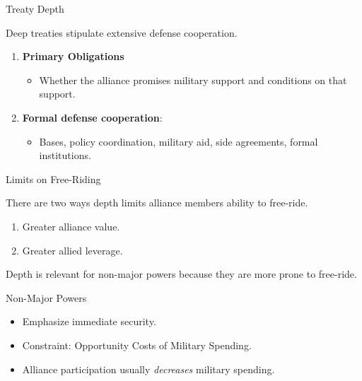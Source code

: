 \documentclass[12pt]{beamer}
\begin{document}
\begin{frame}{Treaty Depth}

Deep treaties stipulate extensive defense cooperation. 

\begin{enumerate} 
\pause
\item \textbf{Primary Obligations} 
\begin{itemize}
\item Whether the alliance promises military support and conditions on that support. 
\end{itemize}
\pause
\item \textbf{Formal defense cooperation}:
\pause
\begin{itemize}
\item Bases, policy coordination, military aid, side agreements, formal institutions. 
\end{itemize}  
\end{enumerate}  

\end{frame}



\begin{frame}{Limits on Free-Riding}

There are two ways depth limits alliance members ability to free-ride. 

\begin{enumerate}
\pause
\item Greater alliance value.   
\pause
\item Greater allied leverage. 
\end{enumerate}

\end{frame}


\begin{frame}[standout]

Depth is relevant for non-major powers because they are more prone to free-ride. 

\end{frame}



\begin{frame}{Non-Major Powers}

\begin{itemize}
\item Emphasize immediate security.
\pause
\item Constraint: Opportunity Costs of Military Spending.  
\pause
\item Alliance participation usually \emph{decreases} military spending. 
\end{itemize} 

\end{frame}
\end{document}

